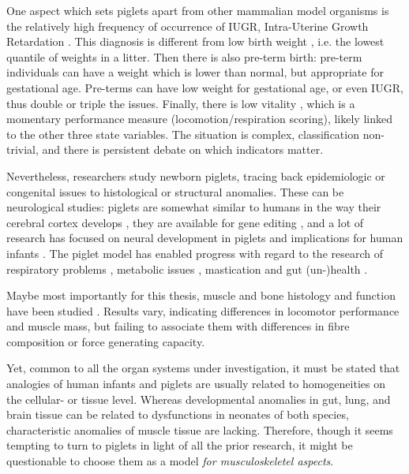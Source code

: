 One aspect which sets piglets apart from other mammalian model organisms is the relatively high frequency of occurrence of IUGR, Intra-Uterine Growth Retardation \citep{Widdowson1971,Wootton1983,Wu2006,VanGinneken2022}.
This diagnosis is different from low birth weight \citep{Wootton1983}, i.e. the lowest quantile of weights in a litter.
Then there is also pre-term birth: pre-term individuals can have a weight which is lower than normal, but appropriate for gestational age.
Pre-terms can have low weight for gestational age, or even IUGR, thus double or triple the issues.
Finally, there is low vitality \citep{VandenHole2018}, which is a momentary performance measure (locomotion/respiration scoring), likely linked to the other three state variables.
The situation is complex, classification non-trivial, and there is persistent debate on which indicators matter.


Nevertheless, researchers study newborn piglets, tracing back epidemiologic or congenital issues to histological or structural anomalies.
These can be neurological studies: piglets are somewhat similar to humans in the way their cerebral cortex develops \citep[e.g.][]{Lind2007}, they are available for gene editing \citep{Lind2007}, and a lot of research has focused on neural development in piglets and implications for human infants \citep{Conrad2012,Radlowski2014,Leyshon2016,Mudd2017,Dickerson1971,Fanous2020}.
The piglet model has enabled progress with regard to the research of respiratory problems \citep{Williams1974,Spengler2019}, metabolic issues \citep{Mellor1986,MotaRojas2011,VandenHole2019}, mastication and gut (un-)health \citep{Che2010,Cilieborg2011,Sangild2006,DInca2011,VandenHole2021,Mayerl2023b}.

Maybe most importantly for this thesis, muscle and bone histology and function have been studied \citep{VandenHole2018b,Alvarenga2013,Andersen2016,Aerts2023,Magrini2023}.
Results vary, indicating differences in locomotor performance and muscle mass, but failing to associate them with differences in fibre composition or force generating capacity.

Yet, common to all the organ systems under investigation, it must be stated that analogies of human infants and piglets are usually related to homogeneities on the cellular- or tissue level.
Whereas developmental anomalies in gut, lung, and brain tissue can be related to dysfunctions in neonates of both species, characteristic anomalies of muscle tissue are lacking.
Therefore, though it seems tempting to turn to piglets in light of all the prior research, it might be questionable to choose them as a model \emph{for musculoskeletel aspects}.


